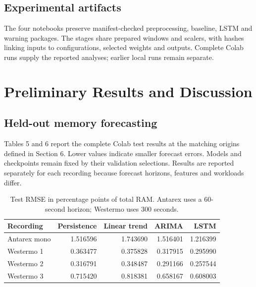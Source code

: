 \documentclass[10pt,a4paper,twocolumn]{article}
\begin{document}
\subsection{Experimental artifacts}

The four notebooks preserve manifest-checked preprocessing, baseline, LSTM and warning packages. The stages share prepared windows and scalers, with hashes linking inputs to configurations, selected weights and outputs. Complete Colab runs supply the reported analyses; earlier local runs remain separate.

\section{Preliminary Results and Discussion}

\subsection{Held-out memory forecasting}

Tables 5 and 6 report the complete Colab test results at the matching origins defined in Section 6. Lower values indicate smaller forecast errors. Models and checkpoints remain fixed by their validation selections. Results are reported separately for each recording because forecast horizons, features and workloads differ.

\begin{table}[tbp]
\centering
\caption{Test RMSE in percentage points of total RAM. Antarex uses a 60-second horizon; Westermo uses 300 seconds.}
\label{tab:5}
\fontsize{8.5}{10.2}\selectfont
\setlength{\tabcolsep}{2.4pt}
\renewcommand{\arraystretch}{1.17}
\begin{tabularx}{\linewidth}{@{}L{1.2}R{0.95}R{0.95}R{0.95}R{0.95}@{}}
\toprule
\textbf{Recording} & \textbf{Persistence} & \textbf{Linear trend} & \textbf{ARIMA} & \textbf{LSTM} \\
\midrule
Antarex mono & 1.516596 & 1.743690 & 1.516401 & 1.216399 \\
Westermo 1 & 0.363477 & 0.375828 & 0.317915 & 0.295990 \\
Westermo 2 & 0.316791 & 0.348487 & 0.291166 & 0.257544 \\
Westermo 3 & 0.715420 & 0.818381 & 0.658167 & 0.608003 \\
\bottomrule
\end{tabularx}
\end{table}
\end{document}
